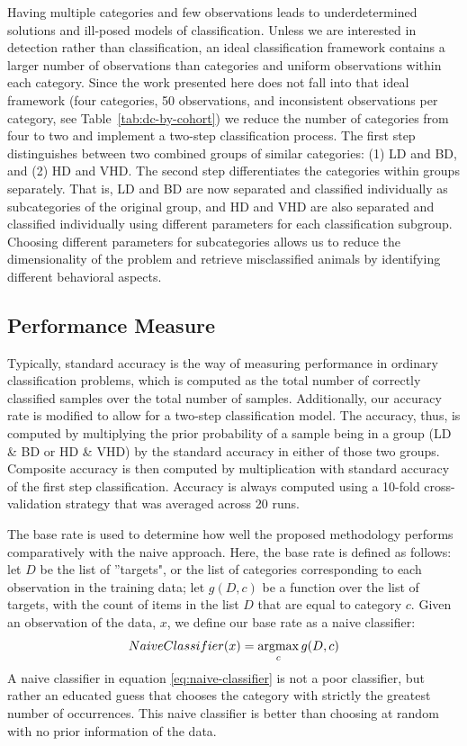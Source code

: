	Having multiple categories and few observations leads to underdetermined solutions and ill-posed models of classification. Unless we are interested in detection rather than classification, an ideal classification framework contains a larger number of observations than categories and uniform observations within each category. Since the work presented here does not fall into that ideal framework (four categories, 50 observations, and inconsistent observations per category, see Table~\ref{tab:dc-by-cohort}) we reduce the number of categories from four to two and implement a two-step classification process. The first step distinguishes between two combined groups of similar categories: (1) LD and BD, and (2) HD and VHD. The second step differentiates the categories within groups separately. That is, LD and BD are now separated and classified individually as subcategories of the original group, and HD and VHD are also separated and classified individually using different parameters for each classification subgroup. Choosing different parameters for subcategories allows us to reduce the dimensionality of the problem and retrieve misclassified animals by identifying different behavioral aspects. 
	
	\subsection{Performance Measure \label{section:performance-measure}}
	Typically, standard accuracy is the way of measuring performance in ordinary classification problems, which is computed as the total number of correctly classified samples over the total number of samples. Additionally, our accuracy rate is modified to allow for a two-step classification model. The accuracy, thus, is computed by multiplying the prior probability of a sample being in a group (LD \& BD or HD \& VHD) by the standard accuracy in either of those two groups. Composite accuracy is then computed by multiplication with standard accuracy of the first step classification. Accuracy is always computed using a 10-fold cross-validation strategy that was averaged across 20 runs. 
	
	The base rate is used to determine how well the proposed methodology performs comparatively with the naive approach. Here, the base rate is defined as follows: let $D$ be the list of ''targets", or the list of categories corresponding to each observation in the training data; let $g(D,c)$ be a function over the list of targets, with the count of items in the list $D$ that are equal to category $c$. Given an observation of the data, $x$, we define our base rate as a naive classifier: 
	\begin{equation} \label{eq:naive-classifier}
	NaiveClassifier(x)= \argmax_{c}g(D, c)
	\end{equation}
	A naive classifier in equation \ref{eq:naive-classifier} is not a poor classifier, but rather an educated guess that chooses the category with strictly the greatest number of occurrences. This naive classifier is better than choosing at random with no prior information of the data.


